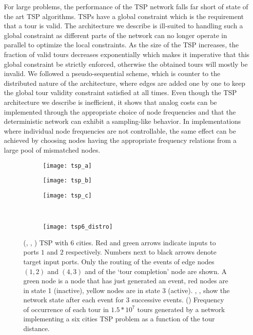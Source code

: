 \documentclass[10pt]{article}
\begin{document}
For large problems, the performance of the TSP network falls far short of state of the art TSP algorithms. TSPs have a global constraint which is the requirement that a tour is valid. The architecture we describe is ill-suited to handling such a global constraint as different parts of the network can no longer operate in parallel to optimize the local constraints. As the size of the TSP increases, the fraction of valid tours decreases exponentially which makes it imperative that this global constraint be strictly enforced, otherwise the obtained tours will mostly be invalid. We followed a pseudo-sequential scheme, which is counter to the distributed nature of the architecture, where edges are added one by one to keep the global tour validity constraint satisfied at all times. Even though the TSP architecture we describe is inefficient, it shows that analog costs can be implemented through the appropriate choice of node frequencies and that the deterministic network can exhibit a sampling-like behavior. In implementations where individual node frequencies are not controllable, the same effect can be achieved by choosing nodes having the appropriate frequency relations from a large pool of mismatched nodes. 

\begin{figure}[h]
 \centering
 \begin{subfigure}[b]{0.3\textwidth}
     \texttt{[image: tsp\_a]} 
     \subcaption{}
     \label{fig:tsp_a}
   \end{subfigure}
   \quad
   \begin{subfigure}[b]{0.3\textwidth}
     \texttt{[image: tsp\_b]} 
     \subcaption{}
     \label{fig:tsp_b}
   \end{subfigure}
   \quad
   \begin{subfigure}[b]{0.3\textwidth}
     \texttt{[image: tsp\_c]} 
     \subcaption{}
     \label{fig:tsp_c}
   \end{subfigure} \\

   \begin{subfigure}[b]{0.5\textwidth}
     \texttt{[image: tsp6\_distro]} 
     \subcaption{}
     \label{fig:tsp_d}
   \end{subfigure} 



   \caption{(, , ) TSP with 6 cities. Red and green arrows indicate inputs to ports $1$ and $2$ respectively. Numbers next to black arrows denote target input ports. Only the routing of the events of edge nodes $(1,2)$ and $(4,3)$ and of the `tour completion' node are shown. A green node is a node that has just generated an event, red nodes are in state 1 (inactive), yellow nodes are in state 3 (active). , ,  show the network state after each event for 3 successive events.  () Frequency of occurrence of each tour in $1.5*10^7$ tours generated by a network implementing a six cities TSP problem as a function of the tour distance.}
\label{fig:tsp}
\end{figure}	
\end{document}
